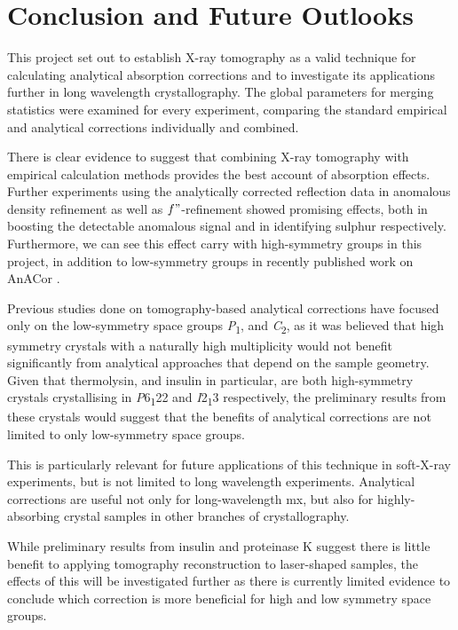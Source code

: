 \section{Conclusion and Future Outlooks}

This project set out to establish X-ray tomography as a valid technique for calculating analytical absorption corrections and to investigate its applications further in long wavelength crystallography. The global parameters for merging statistics were examined for every experiment, comparing the standard empirical and analytical corrections individually and combined.

There is clear evidence to suggest that combining X-ray tomography with empirical calculation methods provides the best account of absorption effects. Further experiments using the analytically corrected reflection data in anomalous density refinement as well as $f"$-refinement showed promising effects, both in boosting the detectable anomalous signal and in identifying sulphur respectively.
Furthermore, we can see this effect carry with high-symmetry groups in this project, in addition to low-symmetry groups in recently published work on AnACor \cite{Lu2024}.%

Previous studies done on tomography-based analytical corrections have focused only on the low-symmetry space groups \textit{P}\textsubscript{1}, and \textit{C}\textsubscript{2}, as it was believed that high symmetry crystals with a naturally high multiplicity would not benefit significantly from analytical approaches that depend on the sample geometry. Given that thermolysin, and insulin in particular, are both high-symmetry crystals crystallising in \textit{P}6\textsubscript{1}22 and \textit{I}2\textsubscript{1}3 respectively, the preliminary results from these crystals would suggest that the benefits of analytical corrections are not limited to only low-symmetry space groups.

This is particularly relevant for future applications of this technique in soft-X-ray experiments, but is not limited to long wavelength experiments. Analytical corrections are useful not only for long-wavelength \ac{mx}, but also for highly-absorbing crystal samples in other branches of crystallography.

While preliminary results from insulin and proteinase K suggest there is little benefit to applying tomography reconstruction to laser-shaped samples, the effects of this will be investigated further as there is currently limited evidence to conclude which correction is more beneficial for high and low symmetry space groups.

